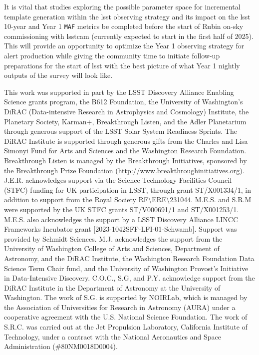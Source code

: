 \documentclass[preprintm,linenumbers]{aastex631}
\newcommand{\maf}{\texttt{MAF}\xspace}
\begin{document}
It is vital that studies exploring the possible parameter space for incremental template generation within the \gls*{lsst} observing strategy and its impact on the \gls*{lsst} 10-year and Year 1 \maf metrics be completed before the start of Rubin on-sky commissioning with \gls*{lsstcam} (currently expected to start in the first half of 2025). 
This will provide an opportunity to optimize the Year 1 observing strategy for alert production while giving the community time to initiate follow-up preparations for the start of \gls*{lsst} with the best picture of what Year 1 nightly outputs of the survey will look like.
		
\begin{acknowledgments}

This work was supported in part by the LSST Discovery Alliance Enabling Science grants program, the B612 Foundation, the University of Washington's DiRAC (Data-intensive Research in Astrophysics and Cosmology) Institute, the Planetary Society, Karman+, Breakthrough Listen, and the Adler Planetarium through generous support of the LSST Solar System Readiness Sprints. 
The DiRAC Institute is supported through generous gifts from the Charles and Lisa Simonyi Fund for Arts and Sciences and the Washington Research Foundation.
Breakthrough Listen is managed by the Breakthrough Initiatives, sponsored by the Breakthrough Prize Foundation (\url{http://www.breakthroughinitiatives.org}). 
J.E.R. acknowledges support via the Science Technology Facilities Council (STFC) funding for UK participation in LSST, through grant ST/X001334/1, in addition to support from the Royal Society RF\textbackslash ERE\textbackslash231044.
M.E.S. and S.R.M were supported by the UK STFC grants ST/V000691/1 and ST/X001253/1. 
M.E.S. also acknowledges the support by a LSST Discovery Alliance LINCC Frameworks Incubator grant [2023-1042SFF-LFI-01-Schwamb]. 
Support was provided by Schmidt Sciences. 
M.J. acknowledges the support from the University of Washington College of Arts and Sciences, Department of Astronomy, and the DiRAC Institute, the Washington Research Foundation Data Science Term Chair fund, and the University of Washington Provost's Initiative in Data-Intensive Discovery. 
C.O.C., S.G, and P.Y. acknowledge support from the DiRAC Institute in the Department of Astronomy at the University of Washington. 
The work of S.G. is supported by NOIRLab, which is managed by the Association of Universities for Research in Astronomy (AURA) under a cooperative agreement with the U.S. National Science Foundation.
The work of S.R.C. was carried out at the Jet Propulsion Laboratory, California Institute of Technology, under a contract with the National Aeronautics and Space Administration (\#80NM0018D0004).


\end{acknowledgments}
\end{document}

